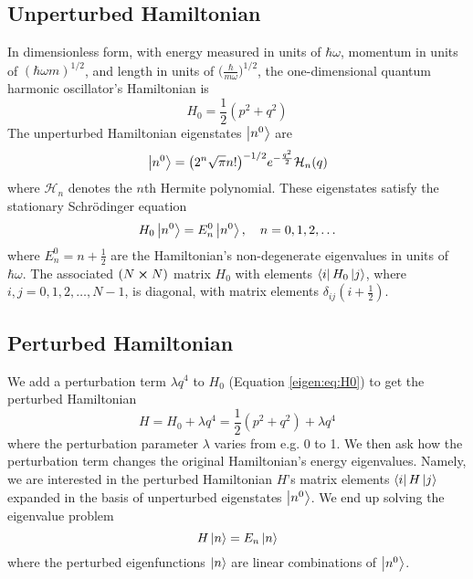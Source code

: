 \documentclass[11pt, a4paper]{article}
\newcommand{\schro}{Schr\"{o}dinger\xspace}
\begin{document}
\subsection{Unperturbed Hamiltonian}
In dimensionless form, with energy measured in units of $ \hbar \omega $, momentum in units of $ (\hbar \omega m)^{1/2} $, and length in units of $ \big(\frac{\hbar}{m \omega}\big)^{1/2} $, the one-dimensional quantum harmonic oscillator's Hamiltonian is
\begin{equation}
	H_{0} = \frac{1}{2}(p^{2} + q^{2}) \label{eigen:eq:H0}
\end{equation}
The unperturbed Hamiltonian eigenstates $ \ket{n^{0}} $ are
\begin{equation}
	\ket{n^{0}} = \big(2^{n}\sqrt{\pi}n!\big)^{-1/2}e^{-\frac{q^{2}}{2}}\mathcal{H}_{n}(q) \label{eigen:eq:qho-basis}
\end{equation}
where $ \mathcal{H}_{n} $ denotes the $ n $th Hermite polynomial. These eigenstates satisfy the stationary \schro equation
\begin{equation*}
	H_{0}\ket{n^{0}} = E_{n}^{0}\ket{n^{0}}, \quad  n = 0, 1, 2, \ldots
\end{equation*} 
where $ E_{n}^{0} = n + \frac{1}{2} $ are the Hamiltonian's non-degenerate eigenvalues in units of $ \hbar \omega $. The associated $ (N \cross N) $ matrix $ H_{0} $ with elements $ \bra{i}H_{0}\ket{j} $, where $ i,j = 0, 1, 2, \ldots, N-1 $, is diagonal, with matrix elements $ \delta_{ij}(i + \frac{1}{2}) $. 

\subsection{Perturbed Hamiltonian}
We add a perturbation term $ \lambda q^{4} $ to $ H_{0} $ (Equation \ref{eigen:eq:H0}) to get the perturbed Hamiltonian
\begin{equation*}
	H = H_{0} + \lambda q^{4} = \frac{1}{2}(p^{2} + q^{2}) + \lambda q^{4}
\end{equation*}
where the perturbation parameter $ \lambda $ varies from e.g. 0 to 1. We then ask how the perturbation term changes the original Hamiltonian's energy eigenvalues. Namely, we are interested in the perturbed Hamiltonian $ H $'s matrix elements $ \bra{i}H\ket{j} $ expanded in the basis of unperturbed eigenstates $ \ket{n^{0}} $. We end up solving the eigenvalue problem 
\begin{equation*}
	H\ket{n} = E_{n} \ket{n}
\end{equation*}
where the perturbed eigenfunctions $ \ket{n} $ are linear combinations of $ \ket{n^{0}} $.
\end{document}
